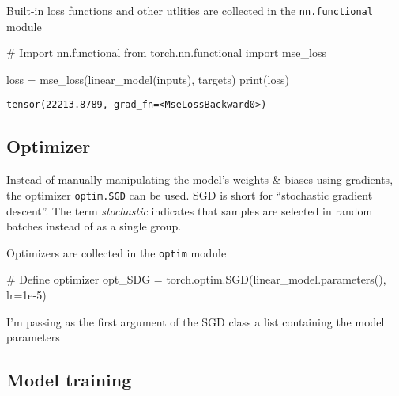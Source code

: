 \documentclass[
  letterpaper,
  DIV=11,
  numbers=noendperiod]{scrartcl}
\newenvironment{Shaded}{\begin{snugshade}}{\end{snugshade}}
\newcommand{\BuiltInTok}[1]{\textcolor[rgb]{0.00,0.23,0.31}{#1}}
\newcommand{\CommentTok}[1]{\textcolor[rgb]{0.37,0.37,0.37}{#1}}
\newcommand{\FloatTok}[1]{\textcolor[rgb]{0.68,0.00,0.00}{#1}}
\newcommand{\ImportTok}[1]{\textcolor[rgb]{0.00,0.46,0.62}{#1}}
\newcommand{\NormalTok}[1]{\textcolor[rgb]{0.00,0.23,0.31}{#1}}
\newcommand{\OperatorTok}[1]{\textcolor[rgb]{0.37,0.37,0.37}{#1}}
\begin{document}
Built-in loss functions and other utlities are collected in the
\texttt{nn.functional} module

\begin{Shaded}
\begin{Highlighting}[]
\CommentTok{\# Import nn.functional}
\ImportTok{from}\NormalTok{ torch.nn.functional }\ImportTok{import}\NormalTok{ mse\_loss}
\end{Highlighting}
\end{Shaded}

\begin{Shaded}
\begin{Highlighting}[]
\NormalTok{loss }\OperatorTok{=}\NormalTok{ mse\_loss(linear\_model(inputs), targets)}
\BuiltInTok{print}\NormalTok{(loss)}
\end{Highlighting}
\end{Shaded}

\begin{verbatim}
tensor(22213.8789, grad_fn=<MseLossBackward0>)
\end{verbatim}

\hypertarget{optimizer}{%
\subsection{Optimizer}\label{optimizer}}

Instead of manually manipulating the model's weights \& biases using
gradients, the optimizer \texttt{optim.SGD} can be used. SGD is short
for ``stochastic gradient descent''. The term \emph{stochastic}
indicates that samples are selected in random batches instead of as a
single group.

Optimizers are collected in the \texttt{optim} module

\begin{Shaded}
\begin{Highlighting}[]
\CommentTok{\# Define optimizer}
\NormalTok{opt\_SDG }\OperatorTok{=}\NormalTok{ torch.optim.SGD(linear\_model.parameters(), lr}\OperatorTok{=}\FloatTok{1e{-}5}\NormalTok{)}
\end{Highlighting}
\end{Shaded}

I'm passing as the first argument of the SGD class a list containing the
model parameters

\hypertarget{model-training}{%
\subsection{Model training}\label{model-training}}
\end{document}
